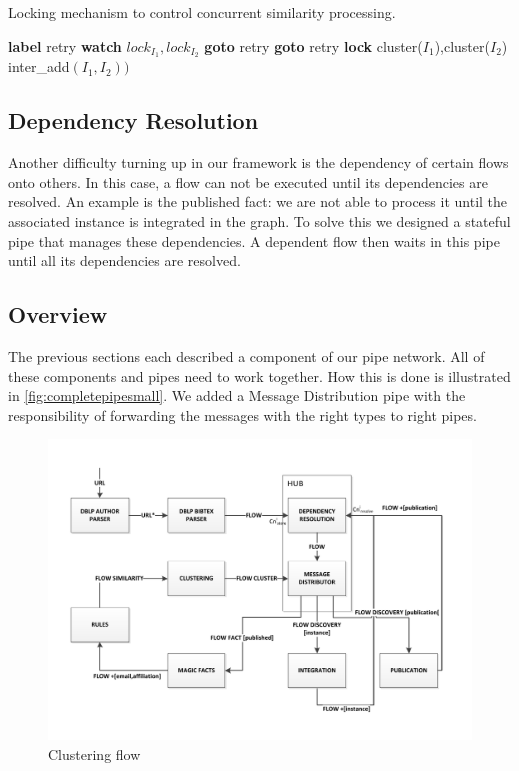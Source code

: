 \begin{algorithm}
\caption{Locking mechanism to control concurrent similarity processing.}
\label{locking}
\begin{algorithmic}
  \STATE \textbf{label} retry
  \STATE \textbf{watch} ${lock}_{I_1},{lock}_{I_2}$
  \STATE \textbf{goto} retry
    \STATE \textbf{goto} retry
  \ENDIF
\ELSE
  \STATE \textbf{lock} cluster($I_1$),cluster($I_2$)
  \STATE inter\_add$(I_1,I_2))$
\ENDIF
\end{algorithmic}
\end{algorithm}

\subsection{Dependency Resolution}
\label{dependencies}

Another difficulty turning up in our framework is the dependency of certain flows onto others. In this case, a flow can not be executed until its dependencies are resolved. An example is the published fact: we are not able to process it until the associated instance is integrated in the graph. To solve this we designed a stateful pipe that manages these dependencies. A dependent flow then waits in this pipe until all its dependencies are resolved.

\subsection{Overview}

The previous sections each described a component of our pipe network. All of these components and pipes need to work together. How this is done is illustrated in \autoref{fig:completepipesmall}. We added a Message Distribution pipe with the responsibility of forwarding the messages with the right types to right pipes.

\begin{figure}[htb]
	\centering
		\includegraphics[width=1\textwidth]{fig/completepipesmall}
	\caption{Clustering flow}
	\label{fig:completepipesmall}
\end{figure}


